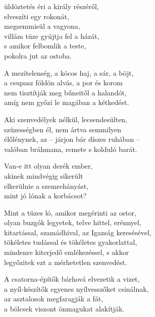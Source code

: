 \begin{dhpverse}

üldöztetés éri a király részéről,\\
elveszíti egy rokonát,\\
megsemmisül a vagyona,\\
villám tüze gyújtja fel a házát,\\
s amikor felbomlik a teste,\\
pokolra jut az ostoba.

 A mezítelenség, a kócos haj, a sár, a böjt,\\
a csupasz földön alvás, a por és korom\\
nem tisztítják meg bűneitől a halandót,\\
amíg nem győzi le magában a kétkedést.

 Aki szenvedélyek nélkül, lecsendesülten,\\
szüzességben él, nem ártva semmilyen\\
élőlénynek, az – járjon bár díszes ruhában –\\
valóban bráhmana, remete s kolduló barát.

 Van-e itt olyan derék ember,\\
akinek mindvégig sikerült\\
elkerülnie a szemrehányást,\\
mint jó lónak a korbácsot?

 Mint a tüzes ló, amikor megérinti az ostor,\\
olyan buzgók legyetek, telve hittel, erénnyel,\\
kitartással, szamádhival, az Igazság keresésével,\\
tökéletes tudással és tökéletes gyakorlattal,\\
mindenre kiterjedő emlékezéssel, s akkor\\
legyőzitek ezt a mérhetetlen szenvedést.

\end{dhpverse}
\newpage
\begin{dhpverse}

 A csatorna-építők bárhová elvezetik a vizet,\\
a nyíl-készítők egyenes nyílvesszőket csinálnak,\\
az asztalosok megfaragják a fát,\\
a bölcsek viszont önmagukat alakítják.

\end{dhpverse}
